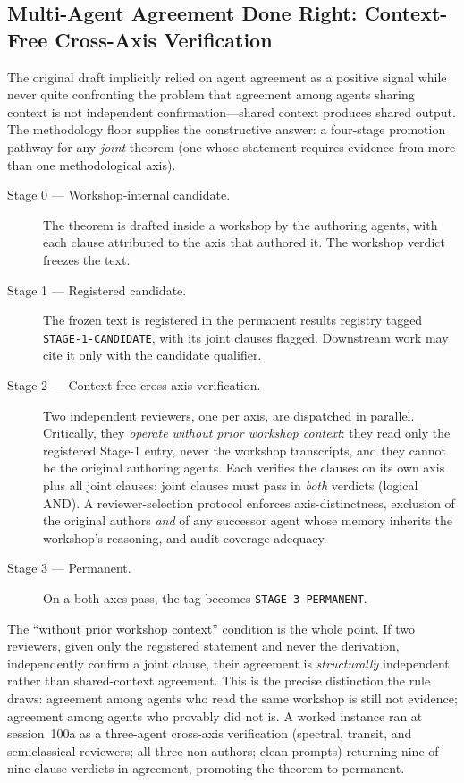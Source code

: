 \documentclass[12pt,a4paper]{article}
\begin{document}
\subsection{Multi-Agent Agreement Done Right: Context-Free Cross-Axis Verification}
\label{sec:floor-stage2}

The original draft implicitly relied on agent agreement as a positive signal while never quite confronting the problem that agreement among agents sharing context is not independent confirmation---shared context produces shared output. The methodology floor supplies the constructive answer: a four-stage promotion pathway for any \emph{joint} theorem (one whose statement requires evidence from more than one methodological axis).

\begin{description}
    \item[Stage 0 --- Workshop-internal candidate.] The theorem is drafted inside a workshop by the authoring agents, with each clause attributed to the axis that authored it. The workshop verdict freezes the text.
    \item[Stage 1 --- Registered candidate.] The frozen text is registered in the permanent results registry tagged \texttt{STAGE-1-CANDIDATE}, with its joint clauses flagged. Downstream work may cite it only with the candidate qualifier.
    \item[Stage 2 --- Context-free cross-axis verification.] Two independent reviewers, one per axis, are dispatched in parallel. Critically, they \emph{operate without prior workshop context}: they read only the registered Stage-1 entry, never the workshop transcripts, and they cannot be the original authoring agents. Each verifies the clauses on its own axis plus all joint clauses; joint clauses must pass in \emph{both} verdicts (logical AND). A reviewer-selection protocol enforces axis-distinctness, exclusion of the original authors \emph{and} of any successor agent whose memory inherits the workshop's reasoning, and audit-coverage adequacy.
    \item[Stage 3 --- Permanent.] On a both-axes pass, the tag becomes \texttt{STAGE-3-PERMANENT}.
\end{description}

The ``without prior workshop context'' condition is the whole point. If two reviewers, given only the registered statement and never the derivation, independently confirm a joint clause, their agreement is \emph{structurally} independent rather than shared-context agreement. This is the precise distinction the rule draws: agreement among agents who read the same workshop is still not evidence; agreement among agents who provably did not is. A worked instance ran at session~100a as a three-agent cross-axis verification (spectral, transit, and semiclassical reviewers; all three non-authors; clean prompts) returning nine of nine clause-verdicts in agreement, promoting the theorem to permanent.
\end{document}
